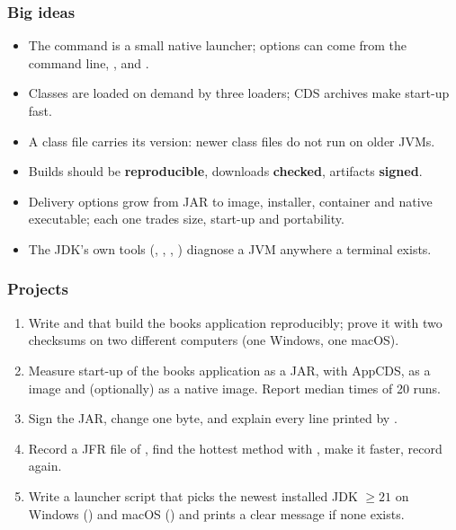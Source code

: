 \documentclass[aspectratio=169,10pt,compress]{beamer}
\begin{document}
\begin{frame}[t,fragile] \frametitle{Big ideas}
  \begin{itemize}
    \item The  command is a small native launcher; options can come from the command line, ,
       and .
    \item Classes are loaded on demand by three loaders; CDS archives make start-up fast.
    \item A class file carries its version: newer class files do not run on older JVMs.
    \item Builds should be \textbf{reproducible}, downloads \textbf{checked}, artifacts \textbf{signed}.
    \item Delivery options grow from JAR to  image, installer, container and native executable;
      each one trades size, start-up and portability.
    \item The JDK's own tools (, , , ) diagnose a JVM anywhere a terminal exists.
  \end{itemize}
\end{frame}




\begin{frame}[t,fragile] \frametitle{Projects}
  \begin{enumerate}\small
    \item Write  and  that build the books application reproducibly; prove it with two
      checksums on two different computers (one Windows, one macOS).
    \item Measure start-up of the books application as a JAR, with AppCDS, as a  image and (optionally) as a
      native image. Report median times of 20 runs.
    \item Sign the JAR, change one byte, and explain every line printed by .
    \item Record a JFR file of , find the hottest method with , make it faster, record again.
    \item Write a launcher script that picks the newest installed JDK $\geq 21$ on Windows () and macOS
      () and prints a clear message if none exists.
  \end{enumerate}
\end{frame}




\begin{frame}[t,fragile]
	\begin{center}
		\vspace{4cm}
	\end{center}
\end{frame}
\end{document}
